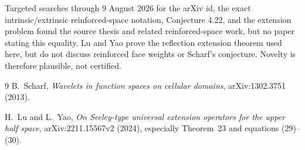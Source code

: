 \documentclass[11pt]{article}
\begin{document}
Targeted searches through 9 August 2026 for the arXiv id, the exact
intrinsic/extrinsic reinforced-space notation, Conjecture 4.22, and the
extension problem found the source thesis and related reinforced-space work,
but no paper stating this equality.  Lu and Yao prove the reflection
extension theorem used here, but do not discuss reinforced face weights or
Scharf's conjecture.  Novelty is therefore plausible, not certified.

\begin{thebibliography}{9}
B.~Scharf,
\emph{Wavelets in function spaces on cellular domains},
arXiv:1302.3751 (2013).

H.~Lu and L.~Yao,
\emph{On Seeley-type universal extension operators for the upper half
space}, arXiv:2211.15567v2 (2024), especially Theorem~23 and
equations (29)--(30).
\end{thebibliography}
\end{document}
